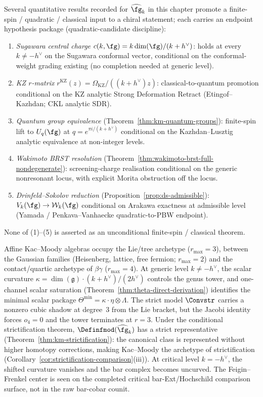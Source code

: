 \begin{remark}
\label{rem:km-endpoint-hypotheses}
Several quantitative results recorded for $\widehat{\fg}_k$ in this
chapter promote a finite-spin / quadratic / classical input to a
chiral statement; each carries an endpoint hypothesis package
(quadratic-candidate discipline):
\begin{enumerate}[label=\textup{(\arabic*)}]
\item \emph{Sugawara central charge} $c(k,\fg) =
k\dim(\fg)/(k+h^\vee)$: holds at every $k\neq -h^\vee$ on the
Sugawara conformal vector, conditional on the conformal-weight
grading existing (no completion needed at generic level).
\item \emph{KZ $r$-matrix} $r^{\mathrm{KZ}}(z)=
\Omega_{\mathrm{KZ}}/((k+h^\vee)z)$: classical-to-quantum
promotion conditional on the KZ analytic Strong Deformation
Retract (Etingof--Kazhdan; CKL analytic SDR).
\item \emph{Quantum group equivalence}
(Theorem~\ref{thm:km-quantum-groups}): finite-spin lift to
$U_q(\fg)$ at $q=e^{\pi i/(k+h^\vee)}$ conditional on the
Kazhdan--Lusztig analytic equivalence at non-integer levels.
\item \emph{Wakimoto BRST resolution}
(Theorem~\ref{thm:wakimoto-brst-full-nondegenerate}): screening-charge
realisation conditional on the generic nonresonant locus, with
explicit Morita obstruction off the locus.
\item \emph{Drinfeld--Sokolov reduction}
(Proposition~\ref{prop:ds-admissible}): $V_k(\fg)\to
\mathcal{W}_k(\fg)$ conditional on Arakawa exactness at admissible
level (Yamada / Penkava--Vanhaecke quadratic-to-PBW endpoint).
\end{enumerate}
None of (1)--(5) is asserted as an unconditional finite-spin /
classical theorem.
\end{remark}

Affine Kac--Moody algebras occupy the Lie/tree archetype
($r_{\max} = 3$), between the Gaussian families
(Heisenberg, lattice, free fermion; $r_{\max} = 2$) and
the contact/quartic archetype of $\beta\gamma$
($r_{\max} = 4$). At generic level $k \neq -h^\vee$, the
scalar curvature
$\kappa = \dim(\mathfrak{g}) \cdot (k + h^\vee)/(2h^\vee)$
controls the genus tower, and one-channel scalar saturation
(Theorem~\ref{thm:theta-direct-derivation}) identifies the
minimal scalar package
$\Theta^{\min} = \kappa \cdot \eta \otimes \Lambda$. The strict model $\Convstr$ carries a nonzero cubic shadow at degree~$3$
from the Lie bracket, but the Jacobi identity forces $o_4 = 0$
and the tower terminates at $r = 3$. Under the conditional
strictification theorem, $\Definfmod(\widehat{\fg}_k)$ has a
strict representative
(Theorem~\ref{thm:km-strictification}): the canonical class is
represented without higher homotopy corrections, making Kac--Moody
the archetype of strictification
(Corollary~\ref{cor:strictification-comparison}(iii)). At critical level
$k = -h^\vee$, the shifted curvature vanishes and the bar complex
becomes uncurved.  The Feigin--Frenkel center is seen on the
completed critical bar-Ext/Hochschild comparison surface, not in the
raw bar-cobar counit.

